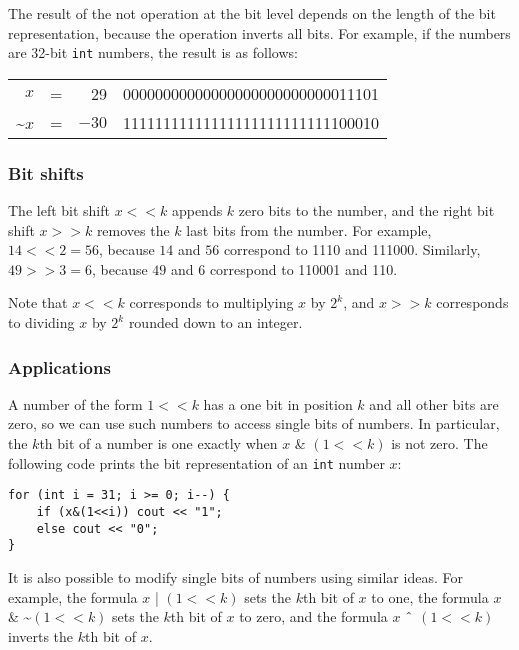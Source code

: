 The result of the not operation at the bit level
depends on the length of the bit representation,
because the operation inverts all bits.
For example, if the numbers are 32-bit
\texttt{int} numbers, the result is as follows:

\begin{center}
\begin{tabular}{rrrr}
$x$ & = & 29 &   00000000000000000000000000011101 \\
\textasciitilde$x$ & = & $-30$ & 11111111111111111111111111100010 \\
\end{tabular}
\end{center}

\subsubsection{Bit shifts}


The left bit shift $x < < k$ appends $k$
zero bits to the number,
and the right bit shift $x > > k$
removes the $k$ last bits from the number.
For example, $14 < < 2 = 56$,
because $14$ and $56$ correspond to 1110 and 111000.
Similarly, $49 > > 3 = 6$,
because $49$ and $6$ correspond to 110001 and 110.

Note that $x < < k$
corresponds to multiplying $x$ by $2^k$,
and $x > > k$
corresponds to dividing $x$ by $2^k$
rounded down to an integer.

\subsubsection{Applications}

A number of the form $1 < < k$ has a one bit
in position $k$ and all other bits are zero,
so we can use such numbers to access single bits of numbers.
In particular, the $k$th bit of a number is one
exactly when $x$ \& $(1 < < k)$ is not zero.
The following code prints the bit representation
of an \texttt{int} number $x$:

\begin{lstlisting}
for (int i = 31; i >= 0; i--) {
    if (x&(1<<i)) cout << "1";
    else cout << "0";
}
\end{lstlisting}

It is also possible to modify single bits
of numbers using similar ideas.
For example, the formula $x$ | $(1 < < k)$
sets the $k$th bit of $x$ to one,
the formula
$x$ \& \textasciitilde $(1 < < k)$
sets the $k$th bit of $x$ to zero,
and the formula
$x$ $\XOR$ $(1 < < k)$
inverts the $k$th bit of $x$.

